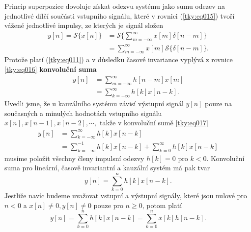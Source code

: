       Princip superpozice dovoluje získat odezvu systému jako sumu odezev na jednotlivé dílčí
      součásti vstupního signálu, které v rovnici (\ref{tky:eq015}) tvoří vážené jednotlivé impulsy,
      ze kterých je signál složen
      \begin{align}
        y[n]=\mathcal{S}\{x[n]\}
          &=\mathcal{S}\{\sum_{m=-\infty}^{\infty}x[m]\delta[n-m]\}  \nonumber \\
          &=\sum_{m=-\infty}^{\infty}x[m]\mathcal{S}\{\delta[n-m]\}. \label{tky:eq016}
      \end{align}
      Protože platí (\ref{tky:eq011}) a v důsledku časové invariance vyplývá z rovnice
      \ref{tky:eq016} \textbf{konvoluční suma} 
      \begin{align}
        y[n]&=\sum_{m=-\infty}^{\infty}h[n-m]x[m]               \nonumber \\
            &=\sum_{k=-\infty}^{\infty}h[k]x[n-k].              \label{tky:eq017}
      \end{align}
      Uvedli jsme, že u kauzálního systému závisí výstupní signál $y[n]$ pouze na současných a
      minulých hodnotách vstupního signálu $x[n], x[n-1], x[n-2], \cdots ,$ takže v konvoluční sumě
      \ref{tky:eq017}
      \begin{align*}
        y[n]&=\sum_{k=-\infty}^{\infty}h[k]x[n-k]              \\               
            &=\sum_{k=-\infty}^{-1}h[k]x[n-k] + \sum_{k=0}^{\infty}h[k]x[n-k]  
      \end{align*}
      musíme položit všechny členy impulsní odezvy $h[k]=0$ pro $k<0$. Konvoluční suma pro
      lineární, časově invariantní a kauzální systém má pak tvar
      \begin{equation}\label{tky:eq018}
        \boxed{y[n]=\sum_{k=0}^{n}h[k]x[n-k].}
      \end{equation}
      Jestliže navíc budeme uvažovat vstupní a výstupní signály, které jsou nulové pro $n<0$ a
      $x[n]\neq0, y[n]\neq0$ pouze pro $n\geq0$, potom platí
      \begin{equation}\label{SAS:eq_konvolucni_suma4}
        y[n]=\sum_{k=0}^{n}h[k]x[n-k]=\sum_{k=0}^{n}x[k]h[n-k].
      \end{equation}
      

